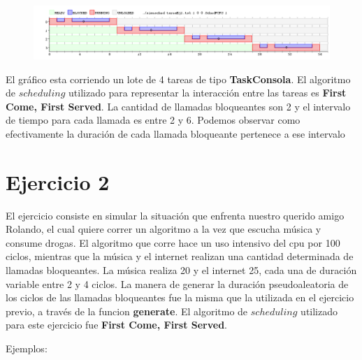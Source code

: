 \documentclass[11pt]{article}
\begin{document}
      \begin{figure}[H]
        \includegraphics[scale=0.5]{ejercicio1}
      \end{figure}

El gráfico esta corriendo un lote de 4 tareas de tipo \textbf{TaskConsola}. El algoritmo de $scheduling$ utilizado para representar la interacción 
entre las tareas es \textbf{First Come, First Served}. La cantidad de llamadas bloqueantes son 2 y el intervalo de 
tiempo para cada llamada es entre 2 y 6. Podemos observar como efectivamente la duración de cada llamada bloqueante pertenece a ese 
intervalo

\newpage

\section{Ejercicio 2}

El ejercicio consiste en simular la situación que enfrenta nuestro querido amigo Rolando, el cual quiere correr un algoritmo a la vez que escucha 
música y consume drogas. El algoritmo que corre hace un uso intensivo del cpu por 100 ciclos, mientras que la música y el internet realizan una 
cantidad determinada de llamadas bloqueantes. La música realiza 20 y el internet 25, cada una de duración variable entre 2 y 4 ciclos. La manera 
de generar la duración pseudoaleatoria de los ciclos de las llamadas bloqueantes fue la misma que la utilizada en el ejercicio previo, a través 
de la funcion \textbf{generate}. El algoritmo de $scheduling$ utilizado para este ejercicio fue \textbf{First Come, First Served}.

Ejemplos:

  
\end{document}
